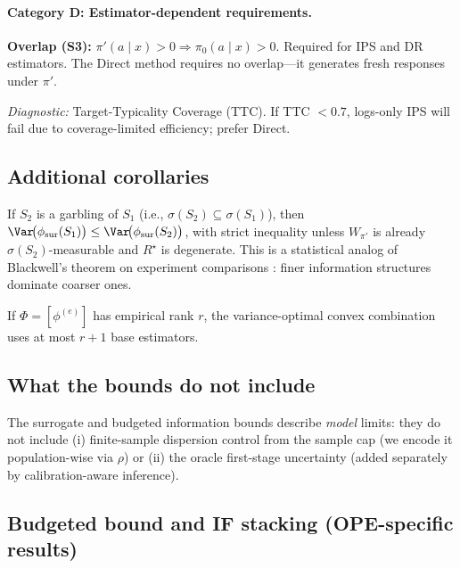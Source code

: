 \paragraph{Category D: Estimator-dependent requirements.}
\textbf{Overlap (S3):} $\pi'(a \mid x) > 0 \Rightarrow \pi_0(a \mid x) > 0$. Required for IPS and DR estimators. The Direct method requires no overlap---it generates fresh responses under $\pi'$.

\emph{Diagnostic:} Target-Typicality Coverage (TTC). If TTC $< 0.7$, logs-only IPS will fail due to coverage-limited efficiency; prefer Direct.

\subsection{Additional corollaries}
\label{app:additional-corollaries}

\begin{corollary}
\label{cor:blackwell}
If $S_2$ is a garbling of $S_1$ (i.e., $\sigma(S_2)\subseteq\sigma(S_1)$), then
$\Var\!\big(\phi_{\mathrm{sur}}(S_1)\big)\le \Var\!\big(\phi_{\mathrm{sur}}(S_2)\big)$,
with strict inequality unless $W_{\pi'}$ is already $\sigma(S_2)$-measurable and $R^\star$ is degenerate.
This is a statistical analog of Blackwell's theorem on experiment comparisons \citep{Blackwell1953}: finer information structures dominate coarser ones.
\end{corollary}

\begin{corollary}
\label{cor:caratheodory}
If $\Phi=[\phi^{(e)}]$ has empirical rank $r$, the variance-optimal convex combination uses at most $r{+}1$
base estimators.
\end{corollary}

\subsection{What the bounds do not include}
\label{app:not-in-bounds}
The surrogate and budgeted information bounds describe \emph{model} limits: they do not include (i) finite-sample dispersion control from the sample cap (we encode it population-wise via $\rho$) or (ii) the oracle first-stage uncertainty (added separately by calibration-aware inference).

\subsection{Budgeted bound and IF stacking (OPE-specific results)}
\label{app:budgeted-stacking}

